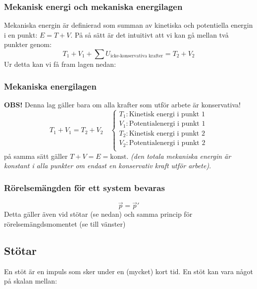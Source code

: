 \documentclass{article}
\newenvironment{ankiflashcard}[1]{}{}
\begin{document}
\begin{paracol}{2}
\begin{ankiflashcard}{Formulera mekanisk energi och skillnaden i mekanisk energi.}
\subsubsection{Mekanisk energi och mekaniska energilagen}
Mekaniska energin är definierad som summan av kinetiska och potentiella energin i en punkt: $E = T + V$. På så sätt är det intuitivt att vi kan gå mellan två punkter genom:
$$
T_1 + V_1 + \sum U_{\text{icke-konservativa krafter}} = T_2 + V_2
$$
\end{ankiflashcard}
Ur detta kan vi få fram lagen nedan:
\begin{ankiflashcard}{Formulera mekaniska energilagen}
    
\subsubsection{Mekaniska energilagen}
\textbf{OBS!} Denna lag gäller bara om alla krafter som utför arbete är konservativa!
$$
T_1 + V_1 = T_2 + V_2\quad\left\{\begin{array}{l}T_1: \text{Kinetisk energi i punkt 1} \\V_1: \text{Potentialenergi i punkt 1} \\T_2: \text{Kinetisk energi i punkt 2} \\V_2: \text{Potentialenergi i punkt 2} \\\end{array}\right.$$
på samma sätt gäller
$
T + V = E = \text{konst.}
$
\textit{(den totala mekaniska energin är konstant i alla punkter om endast en konservativ kraft utför arbete)}.
\end{ankiflashcard}

\begin{ankiflashcard}{Vad gäller för ett systems rörelsemängd?} 
\subsubsection{Rörelsemängden för ett system bevaras}
$$\vec p=\vec p'$$
Detta gäller även vid stötar (se nedan) och samma princip för rörelsemängdsmomentet (se till vänster)
\end{ankiflashcard}

\subsection{Stötar}
En stöt är en impuls som sker under en (mycket) kort tid. En stöt kan vara något på skalan mellan:


\end{paracol}
\end{document}
